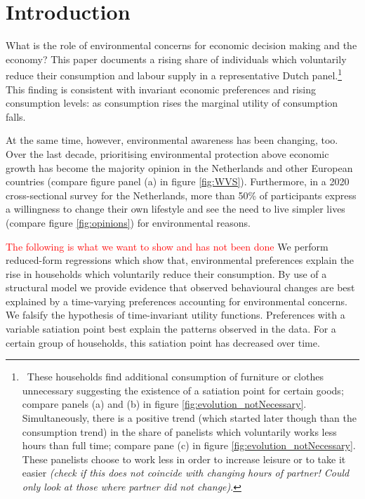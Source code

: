 \documentclass[12pt]{article}
\newcommand{\tr}[1]{\textcolor{red}{#1}}
\begin{document}
\section{Introduction}
What is the role of environmental concerns for economic decision making and the economy? %
This paper documents a rising share of individuals which voluntarily reduce their consumption and labour supply in a representative Dutch panel.\footnote{\ These households find additional consumption of furniture or clothes unnecessary suggesting the existence of a satiation point for certain goods; compare panels (a) and (b) in figure \ref{fig:evolution_notNecessary}. Simultaneously, there is a positive trend (which started later though than the consumption trend) in the share of panelists which voluntarily works less hours than full time; compare pane (c) in figure \ref{fig:evolution_notNecessary}. These panelists choose to work less in order to increase leisure or to take it easier \textit{(check if this does not coincide with changing hours of partner! Could only look at those where partner did not change)}.} 
This finding is consistent with invariant economic preferences and rising consumption levels: as consumption rises the marginal utility of consumption falls. 

At the same time, however, environmental awareness has been changing, too. Over the last decade, prioritising environmental protection above economic growth has become the majority opinion in the Netherlands and other European countries (compare figure panel (a) in figure \ref{fig:WVS}). Furthermore, in a 2020 cross-sectional survey for the Netherlands, more than 50\% of participants express a willingness to change their own lifestyle and see the need to live simpler lives (compare figure \ref{fig:opinions}) for environmental reasons.

\tr{The following is what we want to show and has not been done}
We perform reduced-form regressions which show that,  environmental preferences explain the rise in households which voluntarily reduce their consumption. 
By use of a structural model we provide evidence that observed behavioural changes are best explained by a time-varying preferences accounting for environmental concerns. We falsify the hypothesis of time-invariant utility functions. Preferences with a variable satiation point best explain the patterns observed in the data. For a certain group of households, this satiation point has decreased over time. 
\end{document}
